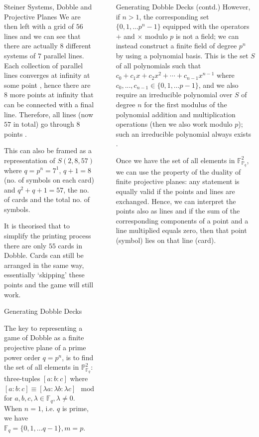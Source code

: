 \documentclass[final]{beamer}
\newlength{\sepwidth}
\newlength{\colwidth}
\newcommand{\separatorcolumn}{\begin{column}{\sepwidth}\end{column}}
\begin{document}
\begin{frame}[t]
\begin{columns}[t]
\begin{column}{\colwidth}
\begin{block}{Steiner Systems, Dobble and Projective Planes}
    We are then left with a grid of $56$ lines and we can see that there are actually $8$ different systems of $7$ parallel lines. Each collection of parallel lines converges at infinity at some point \cite{spencer1999}, hence there are $8$ more points at infinity that can be connected with a final line. Therefore, all lines (now $57$ in total) go through $8$ points \cite{Parker2021}.

    This can also be framed as a representation of $S(2,8,57)$ where $q = p^n = 7^1$, $q + 1 = 8$ (no. of symbols on each card) and $q^2 + q + 1 = 57$, the no. of cards and the total no. of symbols. 

    It is theorised that to simplify the printing process there are only $55$ cards in Dobble. Cards can still be arranged in the same way, essentially `skipping' these points and the game will still work. 

\end{block}

\begin{exampleblock}{Generating Dobble Decks}

    The key to representing a game of Dobble as a finite projective plane of a prime power order $q = p^n$, is to find the set of all elements in $\mathbb{P}^2_{\mathbb{F}_q}$: three-tuples $[a:b:c]$ where $[a:b:c] \equiv [\lambda a:\lambda b:\lambda c] \mod m$ for $a,b,c,\lambda \in \mathbb{F}_q, \lambda \ne 0$. When $n = 1$, i.e. $q$ is prime, we have $\mathbb{F}_q = \{0, 1, ... q-1\}, m = p$. 
\end{exampleblock}
\end{column}

\separatorcolumn

\begin{column}{\colwidth}
\begin{exampleblock}{Generating Dobble Decks (contd.)}
    However, if $n > 1$, the corresponding set $\{ 0, 1, ... p^n-1 \}$ equipped with the operators $+$ and $\times$ modulo $p$ is not a field; we can instead construct a finite field of degree $p^n$ by using a polynomial basis. This is the set $S$ of all polynomials such that $c_0 + c_1x + c_2x^2 + \cdots + c_{n-1}x^{n-1}$ where $c_0, ..., c_{n-1} \in \{0, 1, ... p-1\}$, and we also require an irreducible polynomial over $S$ of degree $n$ for the first modulus of the polynomial addition and multiplication operations (then we also work modulo $p$); such an irreducible polynomial always exists \cite{magidin2012}.
    
    Once we have the set of all elements in $\mathbb{F}^2_{\mathbb{P}_q}$, we can use the property of the duality of finite projective planes: any statement is equally valid if the points and lines are exchanged. Hence, we can interpret the points also as lines and if the sum of the corresponding components of a point and a line multiplied equals zero, then that point (symbol) lies on that line (card).


\end{exampleblock}
\end{column}
\end{columns}
\end{frame}
\end{document}
